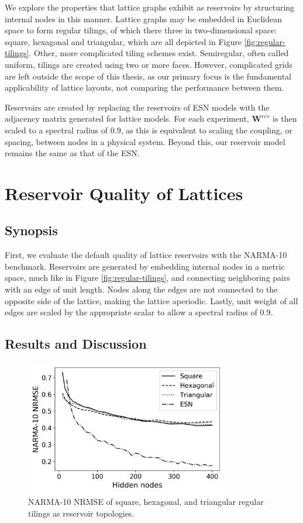 We explore the properties that lattice graphs exhibit as reservoirs by
structuring internal nodes in this manner. Lattice graphs may be embedded in
Euclidean space to form regular tilings, of which there three in two-dimensional
space: square, hexagonal and triangular, which are all depicted in Figure
\ref{fig:regular-tilings}. Other, more complicated tiling schemes
exist. Semiregular, often called uniform, tilings are created using two or more
faces. However, complicated grids are left outside the scope of this thesis, as
our primary focus is the fundamental applicability of lattice layouts, not
comparing the performance between them.

Reservoirs are created by replacing the reservoirs of ESN models with the
adjacency matrix generated for lattice models. For each experiment,
$\mathbf{W}^{res}$ is then scaled to a spectral radius of 0.9, as this is
equivalent to scaling the coupling, or spacing, between nodes in a physical
system. Beyond this, our reservoir model remains the same as that of the ESN.

\section{Reservoir Quality of Lattices}
\label{sec:lattice-quality}

\subsection{Synopsis}

First, we evaluate the default quality of lattice reservoirs with the NARMA-10
benchmark. Reservoirs are generated by embedding internal nodes in a metric
space, much like in Figure \ref{fig:regular-tilings}, and connecting neighboring
pairs with an edge of unit length. Nodes along the edges are not connected to
the opposite side of the lattice, making the lattice aperiodic. Lastly, unit
weight of all edges are scaled by the appropriate scalar to allow a spectral
radius of 0.9.

\subsection{Results and Discussion}

\begin{figure}[htb]
  \centering
  \includegraphics[width=3.5in]{figures/regular-tilings-performance.png}
  \caption{
    NARMA-10 NRMSE of square, hexagonal, and triangular regular tilings as
reservoir topologies.
  }
  \label{fig:rt-performance}
\end{figure}

